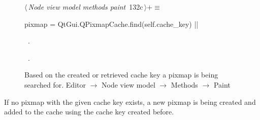 \documentclass[%
    a4paper,    %
    justified,  %
    nobib,      %
    openany     %
]{tufte-book}
\makeatletter
\renewcommand{\label}[1]{\@tufte@label{##1}}%
\makeatother
\begin{document}
\begin{figure}[!htbp]
\begin{flushleft} \small
\begin{minipage}{\linewidth}\label{scrap78}\raggedright\small
{} $\langle\,${\itshape Node view model methods paint}\nobreak\ {\footnotesize {132c}}$\,\rangle+\equiv$
\vspace{-1ex}
\begin{pythoncode}
pixmap = QtGui.QPixmapCache.find(self.cache_key)
|\NWsep|
\end{pythoncode}
\vspace{1.5ex}
\footnotesize
\begin{list}{}{\setlength{\itemsep}{-\parsep}\setlength{\itemindent}{-\leftmargin}}
\item \NWtxtMacroDefBy\ .
\item \NWtxtMacroRefIn\ .

\item{}
\end{list}
\end{minipage}\vspace{4ex}
\end{flushleft}
\caption{Based on the created or retrieved cache key a pixmap is being searched
  for.
  \newline{}\newline{}Editor $\rightarrow$ Node view model $\rightarrow$
  Methods $\rightarrow$ Paint}
\end{figure}

If no pixmap with the given cache key exists, a new pixmap is being created and
added to the cache using the cache key created before.
\end{document}
